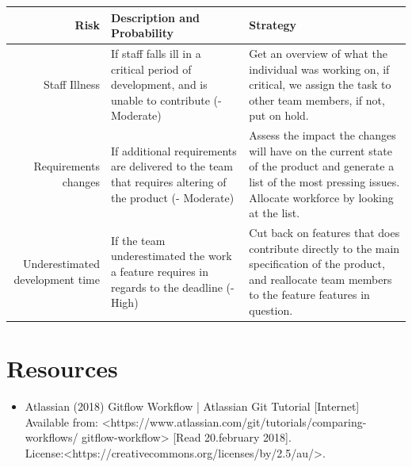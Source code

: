 \documentclass[12pt]{article}%
\begin{document}
\begin{tabularx}{\linewidth}{ r X X }
\hline
Risk & Description and Probability & Strategy \\ \hline

Staff Illness 
& If staff falls ill in a critical period of development, and is unable to contribute (- Moderate)
& Get an overview of what the individual was working on, if critical, we assign the task to other team members, if not, put on hold.\\

Requirements changes        
&If additional requirements are delivered to the team that requires altering of the product (- Moderate)
& Assess the impact the changes will have on the current state of the product and generate a list of the most pressing issues. Allocate workforce by looking at the list.\\ \hline
Underestimated development time
&If the team underestimated the work a feature requires in regards to the deadline (- High)                         
& Cut back on features that does contribute directly to the main specification of the product, and reallocate team members to the feature features in question.                 \\ \hline
\end{tabularx}


\section{Resources}
\begin{itemize}
\item Atlassian (2018) Gitflow Workflow | Atlassian Git Tutorial [Internet] \\
	  Available from: \textless https://www.atlassian.com/git/tutorials/comparing-workflows/
	  gitflow-workflow\textgreater
	  [Read 20.february 2018].\\
	  License:\textless https://creativecommons.org/licenses/by/2.5/au/\textgreater .
\end{itemize}
\end{document}
